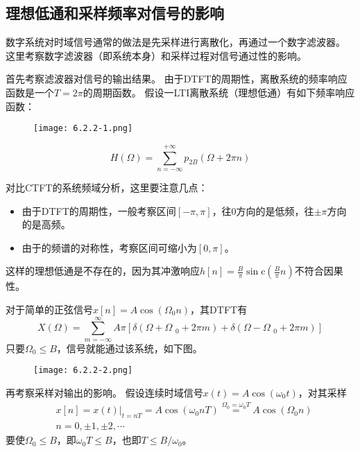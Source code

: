 \subsection{理想低通和采样频率对信号的影响}

数字系统对时域信号通常的做法是先采样进行离散化，再通过一个数字滤波器。
这里考察数字滤波器（即系统本身）和采样过程对信号通过性的影响。

首先考察滤波器对信号的输出结果。
由于DTFT的周期性，离散系统的频率响应函数是一个$T=2\pi $的周期函数。
假设一LTI离散系统（理想低通）有如下频率响应函数：
\begin{figure}[ht]
\centering
\texttt{[image: 6.2.2-1.png]}
\end{figure}
\[
H\left( \varOmega \right) =\sum_{n=-\infty}^{+\infty}{p_{2B}\left( \varOmega +2\pi n \right)}
\]

对比CTFT的系统频域分析，这里要注意几点：
\begin{itemize}
    \item 由于DTFT的周期性，一般考察区间$\left[ -\pi ,\pi \right] $，往0方向的是低频，往$\pm \pi $方向的是高频。
    \item 由于的频谱的对称性，考察区间可缩小为$\left[ 0,\pi \right] $。
\end{itemize}

\begin{tcolorbox}
这样的理想低通是不存在的，因为其冲激响应$h\left[ n \right] =\frac{B}{\pi}\sin\mathrm{c}\left( \frac{B}{\pi}n \right) $不符合因果性。
\end{tcolorbox}

对于简单的正弦信号$x\left[ n \right] =A\cos \left( \varOmega _0n \right) $，其DTFT有
\[
X\left( \varOmega \right) =\sum_{m=-\infty}^{\infty}{A\pi \left[ \delta \left( \varOmega +\varOmega \,\,_0+2\pi m \right) +\delta \left( \varOmega -\varOmega \,\,_0+2\pi m \right) \right]}
\]
只要$\varOmega _0\leqslant B$，信号就能通过该系统，如下图。
\begin{figure}[h]
\centering
\texttt{[image: 6.2.2-2.png]}
\end{figure}

再考察采样对输出的影响。
假设连续时域信号$x\left( t \right) =A\cos \left( \omega _0t \right) $，对其采样
\begin{align*}
&x\left[ n \right] =\left. x\left( t \right) \right|_{t=nT}=A\cos \left( \omega _0nT \right) \overset{\varOmega _0=\omega _0T}{=}A\cos \left( \varOmega _0n \right) \\
&n=0,\pm 1,\pm 2,\cdots
\end{align*}
要使$\varOmega _0\leqslant B$，即$\omega _0T\leqslant B$，也即$T\leqslant B/\omega _0$。

